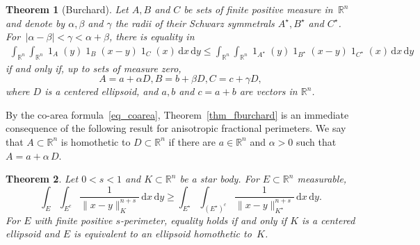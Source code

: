 \documentclass{amsart}
\newtheorem{theorem}{Theorem}
\newcommand{\dvtex}{\,\mathrm{d}}
\renewcommand{\chi}{\operatorname{1}}
\begin{document}
\begin{theorem}[Burchard]
\label{thm_burchard}
Let $A,B$ and $C$ be sets of finite positive measure in
$\,\mathbb R^{n}$ and denote by $\alpha , \beta $ and $\gamma $ the radii
of their Schwarz symmetrals $A^{\star}, B^{\star}$ and $C^{\star}$. For
$\,\vert \alpha - \beta \vert < \gamma < \alpha +\beta $, there is equality
in
%
\begin{multline}
\int _{\mathbb R^{n}}\int _{\mathbb R^{n}} \chi _{A}(y) \chi _{B}(x-y)
\chi _{C}(x) \dvtex x \dvtex y
\leq \int _{\mathbb R^{n}}\int _{\mathbb R^{n}} \chi _{A^{\star}}(y)
\chi _{B^{\star}}(x-y) \chi _{C^{\star}}(x) \dvtex x \dvtex y
\nonumber \end{multline}
%
if and only if, up to sets of measure zero,
%
\begin{equation*}
A=a+\alpha D, B = b+\beta D, C = c+\gamma D,
\end{equation*}
%
where $D$ is a centered ellipsoid, and $a,b$ and $c=a+b$ are vectors in
$\mathbb R^{n}$.
\end{theorem}

By the co-area formula~\eqref{eq_coarea}, Theorem~\ref{thm_fburchard} is
an immediate consequence of the following result for anisotropic fractional
perimeters. We say that $A\subset \mathbb R^{n}$ is homothetic to
$D\subset \mathbb R^{n}$ if there are $a\in \mathbb R^{n}$ and
$\alpha >0$ such that $A=a+\alpha \,D$.

\begin{theorem}%
\label{thm_perburchard}
Let $0<s<1$ and $K\subset \mathbb R^{n}$ be a star body. For
$E\subset \mathbb R^{n}$ measurable,
%
\begin{equation}
\label{eq_perburchard}
\int _{E}\int _{E^{c}}\frac{1}{\|x-y\|^{n+s}_{K}} \dvtex x \dvtex y \geq
\int _{E^{\star}}\int _{(E^{\star})^{c}}
\frac{1}{\|x-y\|^{n+s}_{K^{\star}}} \dvtex x \dvtex y.
\end{equation}
%
For $E$ with finite positive $s$-perimeter, equality holds if and only
if $K$ is a centered ellipsoid and $E$ is equivalent to an ellipsoid homothetic
to~$K$.
\end{theorem}
\end{document}
